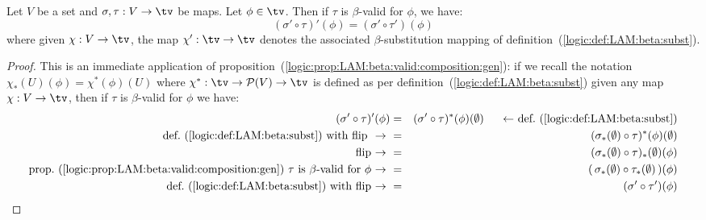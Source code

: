 \begin{prop}\label{logic:prop:LAM:beta:valid:composition}
    Let $V$ be a set and $\sigma,\tau:V\to\tv$ be maps. Let $\phi\in\tv$. Then
    if $\tau$ is $\beta$-valid for $\phi$, we have:
        \[
            (\sigma'\circ\tau)' (\phi) = (\sigma'\circ\tau')(\phi)
        \]
    where given $\chi:V\to\tv$, the map $\chi':\tv\to\tv$ denotes the 
    associated $\beta$-substitution mapping of 
    definition~(\ref{logic:def:LAM:beta:subst}).
\end{prop}
\begin{proof}
    This is an immediate application of 
    proposition~(\ref{logic:prop:LAM:beta:valid:composition:gen}): if we recall
    the notation $\chi_{*}(U)(\phi)=\chi^{*}(\phi)(U)$ where $\chi^{*}:\tv\to
    {\cal P}(V)\to\tv$ is defined as per 
    definition~(\ref{logic:def:LAM:beta:subst}) given any map $\chi:V\to\tv$, 
    then if $\tau$ is $\beta$-valid for $\phi$ we have:
        \begin{eqnarray*}(\sigma'\circ\tau)'(\phi)
            &=&(\sigma'\circ\tau)^{*}(\phi)(\emptyset)
            \mbox{\ \ \ \ \ $\leftarrow$\ def.~(\ref{logic:def:LAM:beta:subst})}\\
            \mbox{def.~(\ref{logic:def:LAM:beta:subst}) with flip
            \ $\to$\ }
            &=&(\sigma_{*}(\emptyset)\circ\tau)^{*}(\phi)(\emptyset)\\
            \mbox{flip\ $\to$\ }
            &=&(\sigma_{*}(\emptyset)\circ\tau)_{*}(\emptyset)(\phi)\\
            \mbox{prop.~(\ref{logic:prop:LAM:beta:valid:composition:gen})
            $\tau$ is $\beta$-valid for $\phi$\ $\to$\ }
            &=&(\,\sigma_{*}(\emptyset)\circ\tau_{*}(\emptyset)\,)(\phi)\\
            \mbox{def.~(\ref{logic:def:LAM:beta:subst}) with flip\ $\to$\ }
            &=&(\sigma'\circ\tau')(\phi)
        \end{eqnarray*}
\end{proof}

